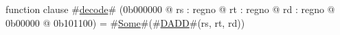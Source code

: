 function clause #\hyperref[zdecode]{decode}# (0b000000 @ rs : regno @ rt : regno @ rd : regno @ 0b00000 @ 0b101100) =
  #\hyperref[zSome]{Some}#(#\hyperref[zDADD]{DADD}#(rs, rt, rd))
